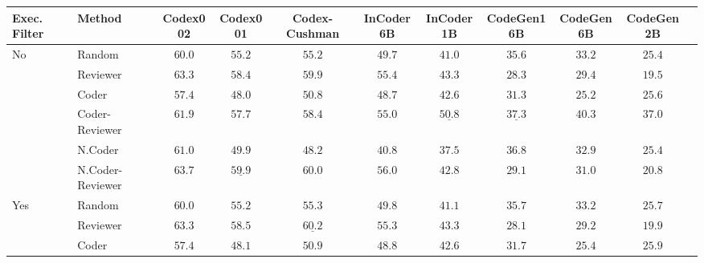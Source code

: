 \documentclass[nohyperref]{article}
\theoremstyle{plain}
\theoremstyle{definition}
\theoremstyle{remark}
\begin{document}
\begin{table*}[]
\setlength{\tabcolsep}{1.5pt}
\footnotesize
\centering
\begin{tabular}{l|lccccccccc}
\toprule
    Exec. Filter & Method &            Codex002 &            Codex001 &       Codex-Cushman &           InCoder6B &           InCoder1B &          CodeGen16B &           CodeGen6B &           CodeGen2B \\
\midrule
\multirow{6}{*}{No} & Random &              $60.0$ &              $55.2$ &              $55.2$ &              $49.7$ &              $41.0$ &              $35.6$ &              $33.2$ &              $25.4$ \\
    & Reviewer &              $63.3$ &              $58.4$ &              $59.9$ &              $55.4$ &              $43.3$ &              $28.3$ &              $29.4$ &              $19.5$ \\
\cmidrule{2-10}
    & Coder &              $57.4$ &              $48.0$ &              $50.8$ &              $48.7$ &              $42.6$ &              $31.3$ &              $25.2$ &              $25.6$ \\
    & Coder-Reviewer &              $61.9$ &              $57.7$ &              $58.4$ &              $55.0$ &  $\underline{50.8}$ &  $\underline{37.3}$ &     $\mathbf{40.3}$ &     $\mathbf{37.0}$ \\
\cmidrule{2-10}
    & N.Coder &              $61.0$ &              $49.9$ &              $48.2$ &              $40.8$ &              $37.5$ &              $36.8$ &              $32.9$ &              $25.4$ \\
    & N.Coder-Reviewer &     $\mathbf{63.7}$ &  $\underline{59.9}$ &              $60.0$ &     $\mathbf{56.0}$ &              $42.8$ &              $29.1$ &              $31.0$ &              $20.8$ \\
\midrule
\multirow{7}{*}{Yes} & Random &              $60.0$ &              $55.2$ &              $55.3$ &              $49.8$ &              $41.1$ &              $35.7$ &              $33.2$ &              $25.7$ \\
    & Reviewer &              $63.3$ &              $58.5$ &  $\underline{60.2}$ &              $55.3$ &              $43.3$ &              $28.1$ &              $29.2$ &              $19.9$ \\
\cmidrule{2-10}
    & Coder &              $57.4$ &              $48.1$ &              $50.9$ &              $48.8$ &              $42.6$ &              $31.7$ &              $25.4$ &              $25.9$ \\

\end{tabular}
\end{table*}
\end{document}
